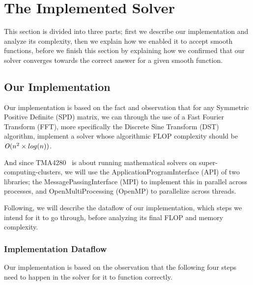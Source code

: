 \documentclass[fontsize=11pt,paper=a4,titlepage]{article}
\begin{document}
\section{The Implemented Solver}

This section is divided into three parts; first we describe our implementation
and analyze its complexity, then we explain how we enabled it to accept smooth
functions, before we finish this section by explaining how we confirmed that our
solver converges towards the correct answer for a given smooth function.

\subsection{Our Implementation}
\label{sec:Impl}

Our implementation is based on the fact and observation that for any Symmetric
Positive Definite (SPD) matrix, we can through the use of a Fast Fourier
Transform (FFT), more specifically the Discrete Sine Transform (DST)
algorithm, implement a solver whose algorithmic FLOP complexity should be
${\it O}(n^2\times log(n))$.

And since TMA4280~\cite{tma4280} is about running mathematical solvers on
super-computing-clusters, we will use the ApplicationProgramInterface (API)
of two libraries; the MessagePassingInterface (MPI) to implement this in
parallel across processes, and OpenMultiProcessing (OpenMP) to parallelize
across threads.

Following, we will describe the dataflow of our implementation, which steps we
intend for it to go through, before analyzing its final FLOP and memory
complexity.

\subsubsection{Implementation Dataflow}
\label{sssec:dataflow}

Our implementation is based on the observation that the following four steps
need to happen in the solver for it to function correctly.
\end{document}
